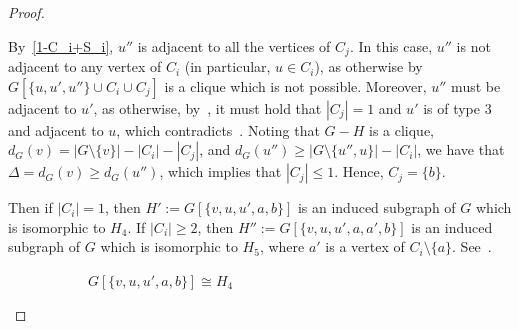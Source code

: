 \documentclass[a4paper,12pt]{article}
\theoremstyle{plain}
\newenvironment{proof*}{\noindent \emph{Proof of the claim.}}{\hfill$\Diamond$}
\begin{document}
\begin{proof}
\begin{proof*}
\begin{itemize}
    By~\ref{1-C_i+S_i}, $u''$ is adjacent to all the vertices of $C_j$. In this case, $u''$ is not adjacent to any vertex of $C_i$ (in particular, $u\in C_i$), as otherwise by~ $G[\{u,u',u''\}\cup C_i\cup C_j]$ is a clique which is not possible. Moreover, $u''$ must be adjacent to $u'$, as otherwise, by~, it must hold that $|C_j|=1$ and $u'$ is of type $3$ and adjacent to $u$, which contradicts~. Noting that $G-H$ is a clique, $d_G(v)=|G\setminus \{v\}|-|C_i|-|C_j|$, and $d_G(u'')\geq |G\setminus \{u'',u\}|-|C_i|$, we have that $\Delta=d_G(v)\geq d_G(u'')$, which implies that $|C_j|\leq 1$. Hence, $C_j=\{b\}$.


    Then if $|C_i|=1$, then $H':=G[\{v,u,u',a,b\}]$ is an induced subgraph of $G$ which is isomorphic to $H_4$. If $|C_i|\geq 2$, then $H'':=G[\{v,u,u',a, a',b\}]$ is an induced subgraph of $G$ which is isomorphic to $H_5$, where $a'$ is a vertex of $C_i\setminus \{a\}$. See~. 
\begin{figure}[ht]
\centering
\begin{subfigure}[t]{.45\textwidth}
\centering
{}
\caption{$G[\{v,u,u',a,b\}]\cong H_4$}
\label{fig:H4inCase1}
\end{subfigure}
\begin{subfigure}[t]{.45\textwidth}
\centering
{}
\end{subfigure}
\end{figure}
\end{itemize}
\end{proof*}
\end{proof}
\end{document}
